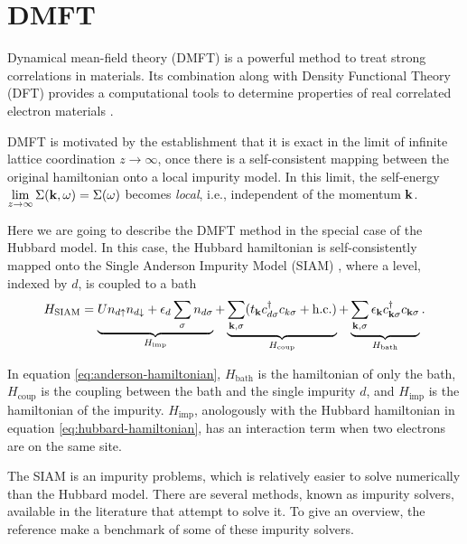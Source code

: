 \documentclass[12pt]{report}
\begin{document}
\section{DMFT} \label{sec:dmft}

Dynamical mean-field theory (DMFT) is a powerful method to treat strong correlations in materials. Its combination along with Density Functional Theory (DFT) provides a computational tools to determine properties of real correlated electron materials \cite{hauleweb, haule_real_materials}.

\n

DMFT is motivated by the establishment that it is exact \cite{thesis_dmft_graz} in the limit of infinite lattice coordination $z \to \infty$, once there is a self-consistent mapping between the original hamiltonian onto a local impurity model. In this limit, the self-energy $\displaystyle{\lim_{z \to \infty}\Sigma({\vb{k}},\omega) = \Sigma(\omega)}$ becomes \textit{local}, i.e., independent of the momentum ${\vb{k}}$.

Here we are going to describe the DMFT method in the special case of the Hubbard model. In this case, the Hubbard hamiltonian is self-consistently mapped \cite{georges1996} onto the Single Anderson Impurity Model (SIAM) \cite{impurity-solvers}, where a level, indexed by $d$, is coupled to a bath
\begin{equation} \label{eq:anderson-hamiltonian}
H_{\text{SIAM}} = \underbrace{U n_{d{\uparrow}} n_{d{\downarrow}} + \epsilon_d \sum_{{\sigma}} n_{d{\sigma}}}_{H_{\text{imp}}}
+ \underbrace{\sum_{{\vb{k}},{\sigma}} (t_{\vb{k}} c_{d{\sigma}}^{\dagger} c_{k{\sigma}} + {\text{h.c.}})}_{H_{\text{coup}}}
+ \underbrace{\sum_{{\vb{k}},{\sigma}} \epsilon_{\vb{k}} c_{{\vb{k}}{\sigma}}^{\dagger} c_{{\vb{k}}{\sigma}}}_{H_{\text{bath}}}.
\end{equation}

In equation \ref{eq:anderson-hamiltonian}, $H_{\text{bath}}$ is the hamiltonian of only the bath, $H_{\text{coup}}$ is the coupling between the bath and the single impurity $d$, and $H_{\text{imp}}$ is the hamiltonian of the impurity. $H_{\text{imp}}$, anologously with the Hubbard hamiltonian in equation \ref{eq:hubbard-hamiltonian}, has an interaction term when two electrons are on the same site.

The SIAM is an impurity problems, which is relatively easier to solve numerically than the Hubbard model. There are several methods, known as impurity solvers, available in the literature that attempt to solve it. To give an overview, the reference \cite{impurity-solvers} make a benchmark of some of these impurity solvers.
\end{document}

